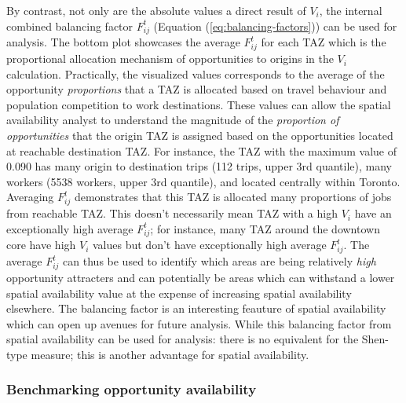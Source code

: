 \documentclass[]{elsarticle} %
\begin{document}
By contrast, not only are the absolute values a direct result of
\(V_i\), the internal combined balancing factor \(F_{ij}^t\) (Equation
(\ref{eq:balancing-factors})) can be used for analysis. The bottom plot
showcases the average \(F_{ij}^t\) for each TAZ which is the
proportional allocation mechanism of opportunities to origins in the
\(V_i\) calculation. Practically, the visualized values corresponds to
the average of the opportunity \emph{proportions} that a TAZ is
allocated based on travel behaviour and population competition to work
destinations. These values can allow the spatial availability analyst to
understand the magnitude of the \emph{proportion of opportunities} that
the origin TAZ is assigned based on the opportunities located at
reachable destination TAZ. For instance, the TAZ with the maximum value
of 0.090 has many origin to destination trips (112 trips, upper 3rd
quantile), many workers (5538 workers, upper 3rd quantile), and located
centrally within Toronto. Averaging \(F_{ij}^t\) demonstrates that this
TAZ is allocated many proportions of jobs from reachable TAZ. This
doesn't necessarily mean TAZ with a high \(V_i\) have an exceptionally
high average \(F_{ij}^t\); for instance, many TAZ around the downtown
core have high \(V_i\) values but don't have exceptionally high average
\(F_{ij}^t\). The average \(F_{ij}^t\) can thus be used to identify
which areas are being relatively \emph{high} opportunity attracters and
can potentially be areas which can withstand a lower spatial
availability value at the expense of increasing spatial availability
elsewhere. The balancing factor is an interesting feauture of spatial
availability which can open up avenues for future analysis. While this
balancing factor from spatial availability can be used for analysis:
there is no equivalent for the Shen-type measure; this is another
advantage for spatial availability.

\hypertarget{benchmarking-opportunity-availability}{%
\subsubsection{Benchmarking opportunity
availability}\label{benchmarking-opportunity-availability}}
\end{document}
